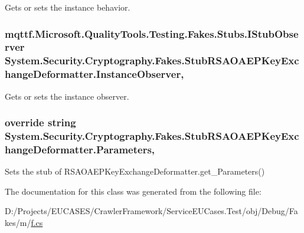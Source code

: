 Gets or sets the instance behavior.

\hypertarget{class_system_1_1_security_1_1_cryptography_1_1_fakes_1_1_stub_r_s_a_o_a_e_p_key_exchange_deformatter_aac31a4a96076b86231e06e47faf36103}{
\subsubsection[{Instance\-Observer}]{\setlength{\rightskip}{0pt plus 5cm}mqttf.\-Microsoft.\-Quality\-Tools.\-Testing.\-Fakes.\-Stubs.\-I\-Stub\-Observer System.\-Security.\-Cryptography.\-Fakes.\-Stub\-R\-S\-A\-O\-A\-E\-P\-Key\-Exchange\-Deformatter.\-Instance\-Observer\hspace{0.3cm}{\ttfamily [get]}, {\ttfamily [set]}}}\label{class_system_1_1_security_1_1_cryptography_1_1_fakes_1_1_stub_r_s_a_o_a_e_p_key_exchange_deformatter_aac31a4a96076b86231e06e47faf36103}


Gets or sets the instance observer.

\hypertarget{class_system_1_1_security_1_1_cryptography_1_1_fakes_1_1_stub_r_s_a_o_a_e_p_key_exchange_deformatter_ab891b1e359e4b89ffdd2a42c02ce82d4}{
\subsubsection[{Parameters}]{\setlength{\rightskip}{0pt plus 5cm}override string System.\-Security.\-Cryptography.\-Fakes.\-Stub\-R\-S\-A\-O\-A\-E\-P\-Key\-Exchange\-Deformatter.\-Parameters\hspace{0.3cm}{\ttfamily [get]}, {\ttfamily [set]}}}\label{class_system_1_1_security_1_1_cryptography_1_1_fakes_1_1_stub_r_s_a_o_a_e_p_key_exchange_deformatter_ab891b1e359e4b89ffdd2a42c02ce82d4}


Sets the stub of R\-S\-A\-O\-A\-E\-P\-Key\-Exchange\-Deformatter.\-get\-\_\-\-Parameters()



The documentation for this class was generated from the following file\-:\begin{DoxyCompactItemize}
\item 
D\-:/\-Projects/\-E\-U\-C\-A\-S\-E\-S/\-Crawler\-Framework/\-Service\-E\-U\-Cases.\-Test/obj/\-Debug/\-Fakes/m/\hyperlink{m_2f_8cs}{f.\-cs}\end{DoxyCompactItemize}
